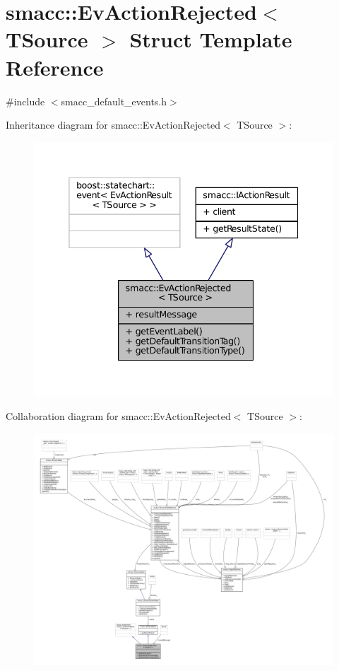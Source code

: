 \hypertarget{structsmacc_1_1EvActionRejected}{}\section{smacc\+:\+:Ev\+Action\+Rejected$<$ T\+Source $>$ Struct Template Reference}
\label{structsmacc_1_1EvActionRejected}


{\ttfamily \#include $<$smacc\+\_\+default\+\_\+events.\+h$>$}



Inheritance diagram for smacc\+:\+:Ev\+Action\+Rejected$<$ T\+Source $>$\+:
\nopagebreak
\begin{figure}[H]
\begin{center}
\leavevmode
\includegraphics[width=338pt]{structsmacc_1_1EvActionRejected__inherit__graph}
\end{center}
\end{figure}


Collaboration diagram for smacc\+:\+:Ev\+Action\+Rejected$<$ T\+Source $>$\+:
\nopagebreak
\begin{figure}[H]
\begin{center}
\leavevmode
\includegraphics[width=350pt]{structsmacc_1_1EvActionRejected__coll__graph}
\end{center}
\end{figure}
